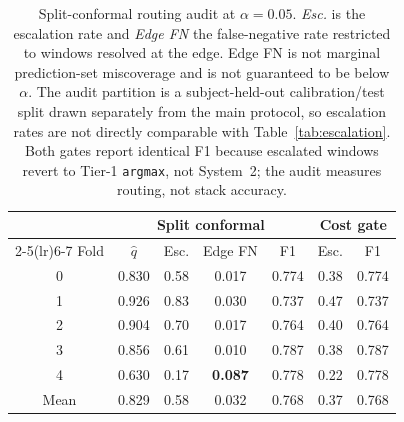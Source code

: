 \begin{table}[!t]
\centering
\caption{Split-conformal routing audit at $\alpha{=}0.05$. \emph{Esc.} is the escalation rate and \emph{Edge FN} the false-negative rate restricted to windows resolved at the edge. Edge FN is not marginal prediction-set miscoverage and is not guaranteed to be below $\alpha$. The audit partition is a subject-held-out calibration/test split drawn separately from the main protocol, so escalation rates are not directly comparable with Table~\ref{tab:escalation}. Both gates report identical F1 because escalated windows revert to Tier-1 \texttt{argmax}, not System~2; the audit measures routing, not stack accuracy.}
\label{tab:conformalgate}
\begin{tabular}{c ccc ccc}
\toprule
 & \multicolumn{4}{c}{Split conformal} & \multicolumn{2}{c}{Cost gate} \\
\cmidrule(lr){2-5}\cmidrule(lr){6-7}
Fold & $\hat{q}$ & Esc. & Edge FN & F1 & Esc. & F1 \\
\midrule
0 & 0.830 & 0.58 & 0.017 & 0.774 & 0.38 & 0.774 \\
1 & 0.926 & 0.83 & 0.030 & 0.737 & 0.47 & 0.737 \\
2 & 0.904 & 0.70 & 0.017 & 0.764 & 0.40 & 0.764 \\
3 & 0.856 & 0.61 & 0.010 & 0.787 & 0.38 & 0.787 \\
4 & 0.630 & 0.17 & \textbf{0.087} & 0.778 & 0.22 & 0.778 \\
\midrule
Mean & 0.829 & 0.58 & 0.032 & 0.768 & 0.37 & 0.768 \\
\bottomrule
\end{tabular}
\end{table}
